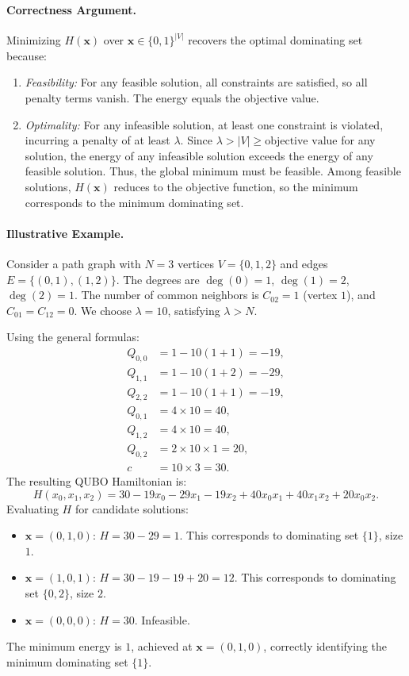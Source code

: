 \documentclass[12pt]{article}
\begin{document}
\paragraph{Correctness Argument.}
Minimizing $H(\mathbf{x})$ over $\mathbf{x} \in \{0, 1\}^{|V|}$ recovers the optimal dominating set because:
\begin{enumerate}
    \item \textit{Feasibility:} For any feasible solution, all constraints are satisfied, so all penalty terms vanish. The energy equals the objective value.
    \item \textit{Optimality:} For any infeasible solution, at least one constraint is violated, incurring a penalty of at least $\lambda$. Since $\lambda > |V| \ge \text{objective value}$ for any solution, the energy of any infeasible solution exceeds the energy of any feasible solution. Thus, the global minimum must be feasible. Among feasible solutions, $H(\mathbf{x})$ reduces to the objective function, so the minimum corresponds to the minimum dominating set.
\end{enumerate}

\paragraph{Illustrative Example.}
Consider a path graph with $N=3$ vertices $V=\{0, 1, 2\}$ and edges $E=\{(0, 1), (1, 2)\}$. The degrees are $\deg(0)=1$, $\deg(1)=2$, $\deg(2)=1$. The number of common neighbors is $C_{02}=1$ (vertex $1$), and $C_{01}=C_{12}=0$. We choose $\lambda = 10$, satisfying $\lambda > N$.

Using the general formulas:
\begin{align}
Q_{0,0} &= 1 - 10(1 + 1) = -19, \\
Q_{1,1} &= 1 - 10(1 + 2) = -29, \\
Q_{2,2} &= 1 - 10(1 + 1) = -19, \\
Q_{0,1} &= 4 \times 10 = 40, \\
Q_{1,2} &= 4 \times 10 = 40, \\
Q_{0,2} &= 2 \times 10 \times 1 = 20, \\
c &= 10 \times 3 = 30.
\end{align}
The resulting QUBO Hamiltonian is:
\begin{equation}
H(x_0, x_1, x_2) = 30 - 19x_0 - 29x_1 - 19x_2 + 40x_0x_1 + 40x_1x_2 + 20x_0x_2.
\end{equation}
Evaluating $H$ for candidate solutions:
\begin{itemize}
    \item $\mathbf{x} = (0, 1, 0)$: $H = 30 - 29 = 1$. This corresponds to dominating set $\{1\}$, size $1$.
    \item $\mathbf{x} = (1, 0, 1)$: $H = 30 - 19 - 19 + 20 = 12$. This corresponds to dominating set $\{0, 2\}$, size $2$.
    \item $\mathbf{x} = (0, 0, 0)$: $H = 30$. Infeasible.
\end{itemize}
The minimum energy is $1$, achieved at $\mathbf{x} = (0, 1, 0)$, correctly identifying the minimum dominating set $\{1\}$.
\end{document}
